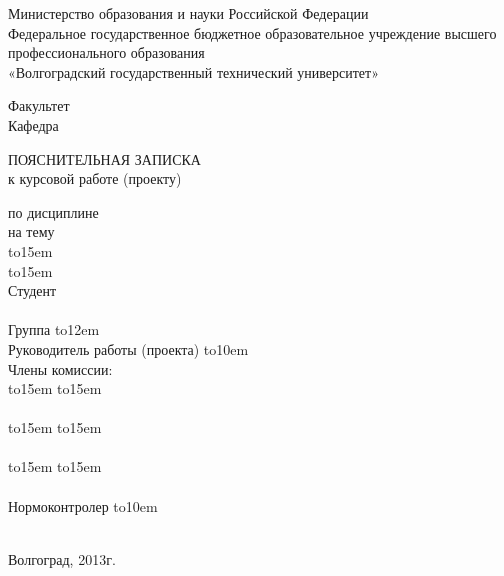 \documentclass[a4paper,14pt]{extarticle} %
\begin{document}
\begin{titlepage}
\newpage
\begin{center}
Министерство образования и науки Российской Федерации\\
Федеральное государственное бюджетное образовательное учреждение высшего профессионального образования\\
 «Волгоградский государственный технический университет»
\end{center}
\def\hrf#1{\hbox to#1{\hrulefill}}
Факультет \hrulefill\\
Кафедра \hrulefill
\begin{center}
ПОЯСНИТЕЛЬНАЯ ЗАПИСКА\\
к курсовой работе (проекту)
\end{center}
по дисциплине \hrulefill\\
на тему \hrulefill\\
 \hrf{15em}\hrulefill\\
 \hrf{15em}\hrulefill\\
Студент\hrulefill\\
\raisebox{15pt}{\hspace{7cm} {\small (фамилия, имя, отчество)} }\\
\vskip -1.5cm
Группа \hrf{12em}\\
Руководитель работы (проекта)  \hrf{10em} \hspace{0.5cm} \hrulefill\\
\raisebox{15pt}{\hspace{7cm} {\small (подпись и дата подписания)} \hspace{0.3cm}{\small (инициалы и фамилия)} }
\vskip -0.5cm
Члены комиссии:\\
\hrf{15em} \hspace{1cm} \hrf{15em}\\
\raisebox{15pt}{\hspace{1cm} {\small (подпись и дата подписания)} \hspace{4cm}{\small (инициалы и фамилия)} }\\
\hrf{15em} \hspace{1cm} \hrf{15em}\\
\raisebox{15pt}{\hspace{1cm} {\small (подпись и дата подписания)} \hspace{4cm}{\small (инициалы и фамилия)} }\\
\hrf{15em} \hspace{1cm} \hrf{15em}\\
\raisebox{15pt}{\hspace{1cm} {\small (подпись и дата подписания)} \hspace{4cm}{\small (инициалы и фамилия)} }\\
\vskip -1cm
Нормоконтролер \hrf{10em} \hspace{1cm} \hrulefill\\
\raisebox{15pt}{\hspace{5cm} {\small (подпись, дата)} \hspace{4cm}{\small (инициалы и фамилия)} }\\
\begin{center}
\vskip -0.9cm
Волгоград, 2013г.
\end{center}
\end{titlepage}
\end{document}
